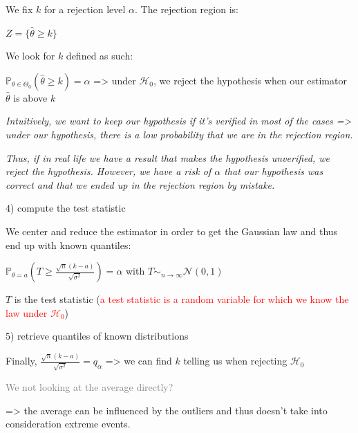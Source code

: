 We fix $k$ for a rejection level $\alpha$. The rejection region is:

$Z=\{\widehat{\theta} \ge k\}$

\vspace{5mm}

We look for $k$ defined as such:

$\mathbb{P}_{\theta \in \Theta_0}(\widehat{\theta} \ge k)=\alpha$ => under $\mathcal{H}_0$, we reject the hypothesis when our estimator $\widehat{\theta}$ is above $k$

\textit{Intuitively, we want to keep our hypothesis if it's verified in most of the cases => under our hypothesis, there is a low probability that we are in the rejection region.}

\textit{Thus, if in real life we have a result that makes the hypothesis unverified, we reject the hypothesis. However, we have a risk of $\alpha$ that our hypothesis was correct and that we ended up in the rejection region by mistake.}

\vspace{5mm}

4) compute the test statistic

\vspace{5mm}

We center and reduce the estimator in order to get the Gaussian law and thus end up with known quantiles:

$\mathbb{P}_{\theta = a}(T \ge \frac{\sqrt{n} (k-a)}{\sqrt{\sigma^2}})=\alpha$ with $T \sim_{n \to \infty} \mathcal{N}(0,1)$

$T$ is the test statistic (\textcolor{red}{a test statistic is a random variable for which we know the law under $\mathcal{H}_0$})

\vspace{5mm}

5) retrieve quantiles of known distributions

\vspace{5mm}

Finally, $\frac{\sqrt{n} (k-a)}{\sqrt{\sigma^2}}=q_\alpha$ => we can find $k$ telling us when rejecting $\mathcal{H}_0$

\vspace{5mm}

\textcolor{gray}{We not looking at the average directly?}

=> the average can be influenced by the outliers and thus doesn't take into consideration extreme events.

\vspace{5mm}

